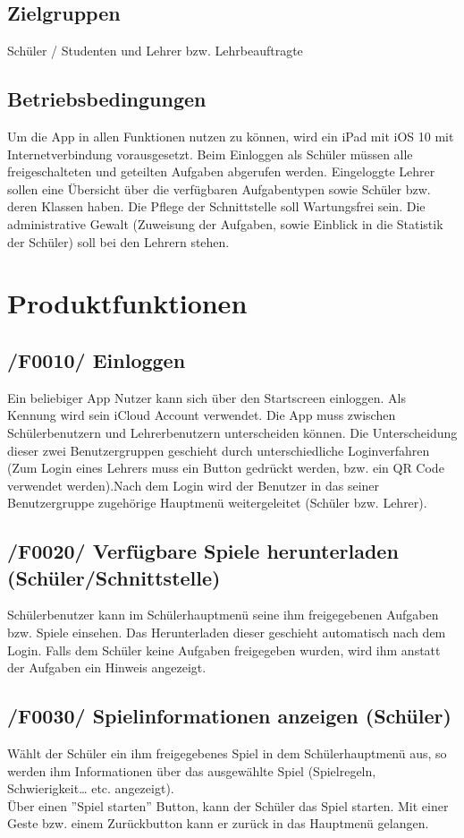 \subsection{Zielgruppen}
Schüler / Studenten und Lehrer bzw. Lehrbeauftragte

\subsection{Betriebsbedingungen}
Um die App in allen Funktionen nutzen zu können, wird ein iPad mit iOS 10 mit Internetverbindung vorausgesetzt. Beim Einloggen als Schüler müssen alle freigeschalteten und geteilten Aufgaben abgerufen werden. Eingeloggte Lehrer sollen eine Übersicht über die verfügbaren Aufgabentypen sowie Schüler bzw. deren Klassen haben. Die Pflege der Schnittstelle soll Wartungsfrei sein. Die administrative Gewalt (Zuweisung der Aufgaben, sowie Einblick in die Statistik der Schüler) soll bei den Lehrern stehen.



\section{Produktfunktionen}
\subsection{/F0010/ Einloggen}
Ein beliebiger App Nutzer kann sich über den Startscreen einloggen. 
Als Kennung wird sein iCloud Account verwendet. Die App muss zwischen Schülerbenutzern und Lehrerbenutzern unterscheiden können. Die Unterscheidung dieser zwei Benutzergruppen geschieht durch unterschiedliche Loginverfahren (Zum Login eines Lehrers muss ein Button gedrückt werden,  bzw. ein QR Code verwendet werden).Nach dem Login wird der Benutzer in das seiner Benutzergruppe zugehörige Hauptmenü weitergeleitet (Schüler bzw. Lehrer).


\subsection{/F0020/ Verfügbare Spiele herunterladen (Schüler/Schnittstelle)}
Schülerbenutzer kann im Schülerhauptmenü seine ihm freigegebenen Aufgaben bzw. Spiele einsehen. Das Herunterladen dieser geschieht automatisch nach dem Login. Falls dem Schüler keine Aufgaben freigegeben wurden, wird ihm anstatt der Aufgaben ein Hinweis angezeigt.


\subsection{/F0030/ Spielinformationen anzeigen (Schüler)}
Wählt der Schüler ein ihm freigegebenes Spiel in dem Schülerhauptmenü aus, so werden ihm Informationen über das ausgewählte Spiel (Spielregeln, Schwierigkeit… etc. angezeigt).\\
Über einen ''Spiel starten'' Button, kann der Schüler das Spiel starten. Mit einer Geste bzw. einem Zurückbutton kann er zurück in das Hauptmenü gelangen.


